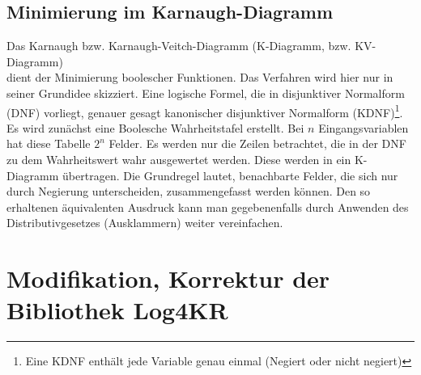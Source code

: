 \documentclass[draft]{scrreprt}
\begin{document}
{	\section{Minimierung im Karnaugh-Diagramm}\label{Min_K_Dia} 
	Das Karnaugh bzw. Karnaugh-Veitch-Diagramm (K-Diagramm, bzw. KV-Diagramm) \\ dient der Minimierung boolescher Funktionen. Das Verfahren wird hier nur in seiner Grundidee skizziert. Eine logische Formel, die in disjunktiver Normalform (DNF) vorliegt, genauer gesagt kanonischer disjunktiver Normalform (KDNF)\footnote{Eine KDNF enthält jede Variable genau einmal (Negiert oder nicht negiert)}. Es wird zunächst eine Boolesche Wahrheitstafel erstellt. Bei $ n $ Eingangsvariablen hat diese Tabelle $ 2^{n} $ Felder. Es werden nur die Zeilen betrachtet, die in der DNF zu dem Wahrheitswert wahr ausgewertet werden. Diese werden in ein K-Diagramm übertragen.  Die Grundregel lautet, benachbarte Felder, die sich nur durch Negierung unterscheiden, zusammengefasst werden können. Den so erhaltenen äquivalenten Ausdruck kann man gegebenenfalls durch Anwenden des Distributivgesetzes (Ausklammern) weiter vereinfachen.

\chapter{Modifikation, Korrektur der Bibliothek Log4KR} \label{Modifikaiton Log4KR}
}
\end{document}
